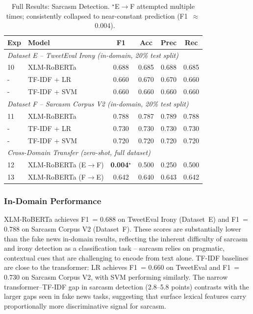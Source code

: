 \documentclass[conference]{IEEEtran}
\begin{document}
\begin{table}[!htb]
\centering
\caption{Full Results: Sarcasm Detection. $^{\star}$E$\to$F attempted multiple times; consistently collapsed to near-constant prediction (F1~$\approx$~0.004).}
\label{tab:main_results_sarc}
\begin{tabular}{llcccc}
\toprule
\textbf{Exp} & \textbf{Model} & \textbf{F1} & \textbf{Acc} &
\textbf{Prec} & \textbf{Rec} \\
\midrule
\multicolumn{6}{l}{\textit{Dataset E -- TweetEval Irony (in-domain, 20\% test split)}} \\
10 & XLM-RoBERTa  & 0.688 & 0.685 & 0.688 & 0.685 \\
-  & TF-IDF + LR  & 0.660 & 0.670 & 0.670 & 0.660 \\
-  & TF-IDF + SVM & 0.660 & 0.660 & 0.660 & 0.660 \\
\midrule
\multicolumn{6}{l}{\textit{Dataset F -- Sarcasm Corpus V2 (in-domain, 20\% test split)}} \\
11 & XLM-RoBERTa  & 0.788 & 0.787 & 0.789 & 0.788 \\
-  & TF-IDF + LR  & 0.730 & 0.730 & 0.730 & 0.730 \\
-  & TF-IDF + SVM & 0.720 & 0.720 & 0.720 & 0.720 \\
\midrule
\multicolumn{6}{l}{\textit{Cross-Domain Transfer (zero-shot, full dataset)}} \\
12 & XLM-RoBERTa (E$\to$F) & \textbf{0.004}$^{\star}$ & 0.500 & 0.250 & 0.500 \\
13 & XLM-RoBERTa (F$\to$E) & 0.642 & 0.640 & 0.643 & 0.642 \\
\bottomrule
\end{tabular}
\end{table}

\subsubsection{In-Domain Performance}

XLM-RoBERTa achieves F1~= 0.688 on TweetEval Irony (Dataset~E) and
F1~= 0.788 on Sarcasm Corpus V2 (Dataset~F). These scores are
substantially lower than the fake news in-domain results, reflecting
the inherent difficulty of sarcasm and irony detection as a
classification task -- sarcasm relies on pragmatic, contextual cues
that are challenging to encode from text alone. TF-IDF baselines are
close to the transformer: LR achieves F1~= 0.660 on TweetEval and
F1~= 0.730 on Sarcasm Corpus V2, with SVM performing similarly.
The narrow transformer--TF-IDF gap in sarcasm detection (2.8--5.8
points) contrasts with the larger gaps seen in fake news tasks,
suggesting that surface lexical features carry proportionally more
discriminative signal for sarcasm.
\end{document}
